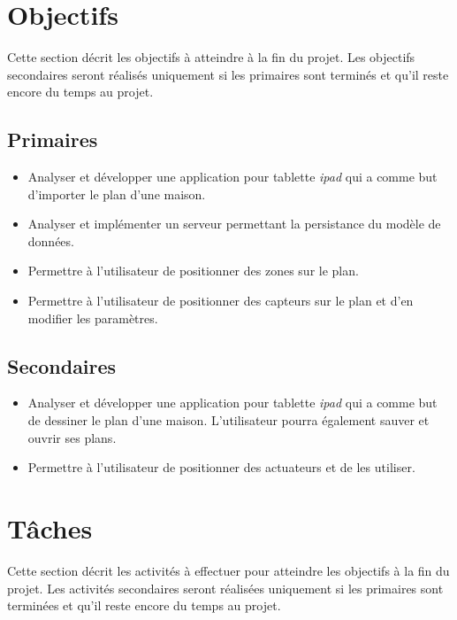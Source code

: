 \section{Objectifs} %
\label{sec:objectifs}
Cette section décrit les objectifs à atteindre à la fin du projet. Les objectifs secondaires seront réalisés uniquement si les primaires sont terminés et qu'il reste encore du temps au projet.

	\subsection{Primaires}

		\begin{itemize}
		
			\item Analyser et développer une application pour tablette \emph{\gls{ipad}} qui a comme but d'importer le plan d'une maison.
			\item Analyser et implémenter un serveur permettant la persistance du modèle de données.
			\item Permettre à l'utilisateur de positionner des zones sur le plan.
			\item Permettre à l'utilisateur de positionner des capteurs sur le plan et d'en modifier les paramètres.
		\end{itemize}


	\subsection{Secondaires}

		\begin{itemize}
		
			\item Analyser et développer une application pour tablette \emph{\gls{ipad}} qui a comme but de dessiner le plan d'une maison. L'utilisateur pourra également sauver et ouvrir ses plans.
			\item Permettre à l'utilisateur de positionner des actuateurs et de les utiliser.
		
		\end{itemize}

\section{Tâches} %
\label{sec:t_ches}
Cette section décrit les activités à effectuer pour atteindre les objectifs à la fin du projet. Les activités secondaires seront réalisées uniquement si les primaires sont terminées et qu'il reste encore du temps au projet.

